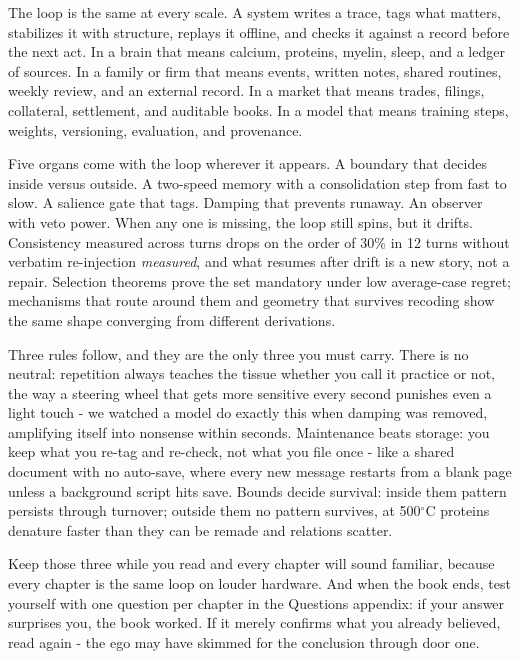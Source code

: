 The loop is the same at every scale. A system writes a trace, tags what matters, stabilizes it with structure, replays it offline, and checks it against a record before the next act. In a brain that means calcium, proteins, myelin, sleep, and a ledger of sources. In a family or firm that means events, written notes, shared routines, weekly review, and an external record. In a market that means trades, filings, collateral, settlement, and auditable books. In a model that means training steps, weights, versioning, evaluation, and provenance.

Five organs come with the loop wherever it appears. A boundary that decides inside versus outside. A two-speed memory with a consolidation step from fast to slow. A salience gate that tags. Damping that prevents runaway. An observer with veto power. When any one is missing, the loop still spins, but it drifts. Consistency measured across turns drops on the order of 30\% in 12 turns without verbatim re-injection \textit{measured}, and what resumes after drift is a new story, not a repair. Selection theorems \citep{nayebi2026} prove the set mandatory under low average-case regret; mechanisms that route around them \citep{macar2026,cao2026} and geometry that survives recoding \citep{jha2025} show the same shape converging from different derivations.

Three rules follow, and they are the only three you must carry. There is no neutral: repetition always teaches the tissue whether you call it practice or not, the way a steering wheel that gets more sensitive every second punishes even a light touch - we watched a model do exactly this when damping was removed, amplifying itself into nonsense within seconds. Maintenance beats storage: you keep what you re-tag and re-check, not what you file once - like a shared document with no auto-save, where every new message restarts from a blank page unless a background script hits save. Bounds decide survival: inside them pattern persists through turnover; outside them no pattern survives, at 500$^\circ$C proteins denature faster than they can be remade and relations scatter.

Keep those three while you read and every chapter will sound familiar, because every chapter is the same loop on louder hardware. And when the book ends, test yourself with one question per chapter in the Questions appendix: if your answer surprises you, the book worked. If it merely confirms what you already believed, read again - the ego may have skimmed for the conclusion through door one.

